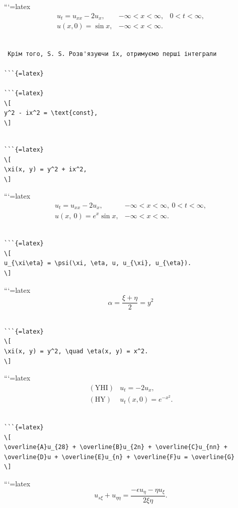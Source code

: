 \documentclass[
  ukrainian,
]{article}
\begin{document}
```{=latex}
\[
\begin{aligned} u_t = u_{xx} - 2u_x, & -\infty < x < \infty, & 0 < t < \infty, \\ u(x, 0) = \sin x, & -\infty < x < \infty. \end{aligned}
\]

\begin{verbatim}

 Крім того, S. S. Розв'язуючи їх, отримуємо перші інтеграли

```{=latex}

```{=latex}
\[
y^2 - ix^2 = \text{const},
\]
\end{verbatim}

\begin{verbatim}

```{=latex}
\[
\xi(x, y) = y^2 + ix^2,
\]
\end{verbatim}

```{=latex}
\[
\begin{aligned} u_t = u_{xx} - 2u_x, & -\infty < x < \infty, \ 0 < t < \infty, \\ u(x, \ 0) = e^x \sin x, & -\infty < x < \infty. \end{aligned}
\]

\begin{verbatim}

```{=latex}
\[
u_{\xi\eta} = \psi(\xi, \eta, u, u_{\xi}, u_{\eta}).
\]
\end{verbatim}

```{=latex}
\[
\alpha = \frac{\xi + \eta}{2} = y^2
\]

\begin{verbatim}

```{=latex}
\[
\xi(x, y) = y^2, \quad \eta(x, y) = x^2.
\]
\end{verbatim}

```{=latex}
\[
\begin{aligned} (\text{YHI}) & u_t = -2u_x, \\ (\text{HY}) & u_t(x, 0) = e^{-x^2}. \end{aligned}
\]

\begin{verbatim}

```{=latex}
\[
\overline{A}u_{28} + \overline{B}u_{2n} + \overline{C}u_{nn} + \overline{D}u + \overline{E}u_{n} + \overline{F}u = \overline{G}
\]
\end{verbatim}

```{=latex}
\[
u_{s\xi} + u_{\eta\eta} = \frac{-\epsilon u_{\eta} - \eta u_{\xi}}{2\xi\eta}.
\]
\end{document}
